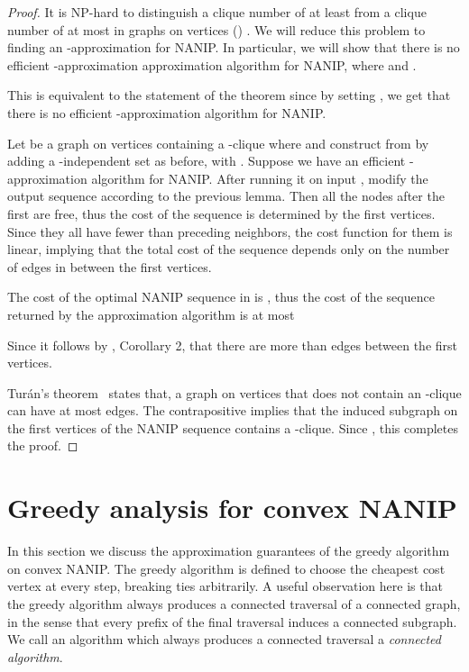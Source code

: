 \documentclass[english]{llncs}
\begin{document}
\begin{proof}
It is NP-hard to distinguish a clique number of at least  from a clique
number of at most  in graphs on  vertices ()
\cite{Zuckerman06}.  We will reduce this problem to finding an
-approximation for NANIP.  In particular, we will show that there
is no efficient -approximation approximation algorithm for NANIP, where  and
.

This is equivalent to the statement of the theorem since by setting
, we get that there is no efficient
-approximation
algorithm for NANIP.

Let  be a graph on  vertices containing a -clique
where  and construct  from  by adding a
-independent set as before, with . Suppose we have an
efficient -approximation algorithm for NANIP. After running it on input
, modify the output sequence according to the previous lemma. Then all
the nodes after the first  are free, thus the cost of the sequence is
determined by the first  vertices. Since they all have fewer than 
preceding neighbors, the cost function for them is linear, implying that the
total cost of the sequence depends only on the number of edges in between the
first  vertices.

The cost of the optimal NANIP sequence in  is , thus the cost of
the sequence returned by the approximation algorithm is at most



Since  it
follows by \cite{Gutfraind14}, Corollary 2, that there are more than
 edges between the first  vertices.

Tur\'an's theorem~\cite{Turan1941} states that, a graph on  vertices that
does not contain an -clique can have at most  edges.
The contrapositive implies that the induced subgraph on the first  vertices
of the NANIP sequence contains a -clique.  Since , this completes the proof.

\end{proof}





\section{Greedy analysis for convex NANIP}

In this section we discuss the approximation guarantees of the greedy algorithm
on convex NANIP. The greedy algorithm is defined to choose the
cheapest cost vertex at every step, breaking ties arbitrarily. A useful
observation here is that the greedy algorithm always produces a connected
traversal of a connected graph, in the sense that every prefix of the final
traversal induces a connected subgraph. We call an algorithm which always produces a
connected traversal a \emph{connected algorithm}.
\end{document}
